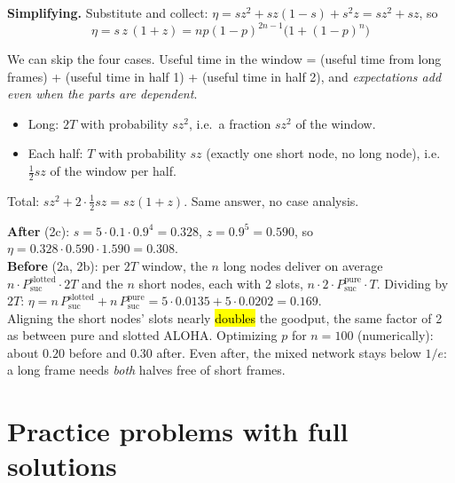 \textbf{Simplifying.} Substitute and collect: $\eta = sz^2 + sz(1-s) + s^2z = sz^2 + sz$, so
\[ \boxed{\ \eta = s\,z\,(1+z) = np(1-p)^{2n-1}\big(1+(1-p)^n\big)\ } \]

\begin{intuition}
We can skip the four cases. Useful time in the window = (useful time from long frames) + (useful time in half 1) + (useful time in half 2), and \emph{expectations add even when the parts are dependent}.
\begin{itemize}
  \item Long: $2T$ with probability $sz^2$, i.e.\ a fraction $sz^2$ of the window.
  \item Each half: $T$ with probability $sz$ (exactly one short node, no long node), i.e.\ $\frac12sz$ of the window per half.
\end{itemize}
Total: $sz^2 + 2\cdot\frac12sz = sz(1+z)$. Same answer, no case analysis.
\end{intuition}

\begin{example}[Did synchronizing help? $n=5$, $p=0.1$]
\textbf{After} (2c): $s = 5\cdot0.1\cdot0.9^4 = 0.328$, $z = 0.9^5 = 0.590$, so $\eta = 0.328\cdot0.590\cdot1.590 = 0.308$.\\
\textbf{Before} (2a, 2b): per $2T$ window, the $n$ long nodes deliver on average $n\cdot P^{\text{slotted}}_{\text{suc}}\cdot2T$ and the $n$ short nodes, each with 2 slots, $n\cdot2\cdot P^{\text{pure}}_{\text{suc}}\cdot T$. Dividing by $2T$:
$\eta = n\,P^{\text{slotted}}_{\text{suc}} + n\,P^{\text{pure}}_{\text{suc}} = 5\cdot0.0135 + 5\cdot0.0202 = 0.169$.\\
Aligning the short nodes' slots nearly \hl{doubles} the goodput, the same factor of 2 as between pure and slotted ALOHA. Optimizing $p$ for $n=100$ (numerically): about $0.20$ before and $0.30$ after.
Even after, the mixed network stays below $1/e$: a long frame needs \emph{both} halves free of short frames.
\end{example}


\section{Practice problems with full solutions}

